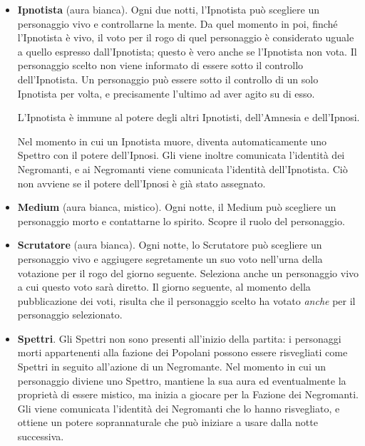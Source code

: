 \documentclass[a4paper,10pt]{article}
\begin{document}
\begin{itemize}
 \item {\bf Ipnotista} (aura bianca). Ogni due notti, l'Ipnotista può scegliere un personaggio vivo e controllarne la mente. Da quel momento in poi, finché l'Ipnotista è vivo, il voto per il rogo di quel personaggio è considerato uguale a quello espresso dall'Ipnotista; questo è vero anche se l'Ipnotista non vota.
 Il personaggio scelto non viene informato di essere sotto il controllo dell'Ipnotista. Un personaggio può essere sotto il controllo di un solo Ipnotista per volta, e precisamente l'ultimo ad aver agito su di esso.
 
 L'Ipnotista è immune al potere degli altri Ipnotisti, dell'Amnesia e dell'Ipnosi.
 
 
 Nel momento in cui un Ipnotista muore, diventa automaticamente uno Spettro con il potere dell'Ipnosi. Gli viene inoltre comunicata l'identità dei Negromanti, e ai Negromanti viene comunicata l'identità dell'Ipnotista. Ciò non avviene se il potere dell'Ipnosi è già stato assegnato.


 \item {\bf Medium} (aura bianca, mistico). Ogni notte, il Medium può scegliere un personaggio morto e contattarne lo spirito. Scopre il ruolo del personaggio.

 
 \item {\bf Scrutatore} (aura bianca). Ogni notte, lo Scrutatore può scegliere  un personaggio vivo e aggiugere segretamente un suo voto nell'urna della votazione per il rogo  del giorno seguente. Seleziona anche un personaggio vivo a cui questo voto sarà diretto. Il giorno seguente, al momento della pubblicazione dei voti, risulta che il personaggio scelto ha votato \emph{anche} per il personaggio selezionato.
 

 \item {\bf Spettri}. Gli Spettri non sono presenti all'inizio della partita: i personaggi morti appartenenti alla fazione dei Popolani possono essere risvegliati come Spettri in seguito all'azione di un Negromante.
 Nel momento in cui un personaggio diviene uno Spettro, mantiene la sua aura ed eventualmente la proprietà di essere mistico, ma inizia a giocare per la Fazione dei Negromanti. Gli viene comunicata l'identità dei Negromanti che lo hanno risvegliato, e ottiene un potere soprannaturale che può iniziare a usare dalla notte successiva. %
 

\end{itemize}
\end{document}
